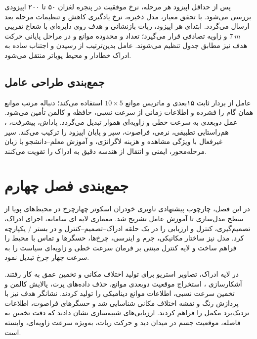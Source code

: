 پس از حداقل اپیزود هر مرحله، نرخ موفقیت در پنجره لغزان ۵۰ تا ۲۰۰ اپیزودی بررسی می‌شود. با تحقق معیار، مدل ذخیره، نرخ یادگیری کاهش و تنظیمات مرحله بعد ارسال می‌گردد. ابتدای هر اپیزود، ربات بازنشانی و هدف روی دایره‌ای با شعاع تقریبی \(7~m\) و زاویه تصادفی قرار می‌گیرد؛ تعداد و محدوده موانع و در مراحل پایانی حرکت هدف نیز مطابق جدول تنظیم می‌شوند. عامل بدین‌ترتیب از رسیدن و اجتناب ساده به ادراک خطادار و محیط پویاتر منتقل می‌شود.

\subsection{جمع‌بندی طراحی عامل}
\label{subsec:agent_design_summary_final}

عامل از بردار ثابت ۱۵بعدی و ماتریس موانع \(10\times5\) استفاده می‌کند؛  دنباله مرتب موانع همان گام را فشرده و اطلاعات زمانی از سرعت نسبی، حافظه و کالمن تأمین می‌شود. عمل دوبعدی به سرعت خطی و زاویه‌ای هموار تبدیل می‌گردد. پاداش، پیشرفت، ، هم‌راستایی تطبیقی، نرمی، فراصوت، سپر و پایان اپیزود را ترکیب می‌کند. سپر غیرفعال با ویژگی مشاهده و هزینه لاگرانژی، و آموزش معلم--دانشجو با زیان مرحله‌محور، ایمنی و انتقال از هندسه دقیق به ادراک را تقویت می‌کنند.

\section{جمع‌بندی فصل چهارم}
\label{sec:chapter4_summary}

در این فصل، چارچوب پیشنهادی ناوبری خودران اسکوتر چهارچرخ در محیط‌های پویا از سطح مدل‌سازی تا آموزش عامل تشریح شد. معماری لایه ای سامانه، اجزای ادراک، تصمیم‌گیری، کنترل و ارزیابی را در یک حلقه ادراک--تصمیم--کنترل و در بستر / یکپارچه کرد. مدل  نیز ساختار مکانیکی، جرم و اینرسی، چرخ‌ها، حسگرها و تماس با محیط را فراهم ساخت و لایه کنترل مبتنی بر  فرمان سرعت خطی و زاویه‌ای سیاست را به سرعت چهار چرخ تبدیل نمود.

در لایه ادراک، تصاویر استریو برای تولید اختلاف مکانی و تخمین عمق به کار رفتند. آشکارسازی ، استخراج موقعیت دوبعدی موانع، حذف داده‌های پرت، پالایش کالمن و تخمین سرعت نسبی، اطلاعات موانع دینامیکی را تولید کردند. نشانگر هدف نیز با پردازش رنگ و نقشه اختلاف مکانی شناسایی شد و حسگرهای فراصوت، اطلاعات نزدیک‌برد مکمل را فراهم کردند. ارزیابی‌های شبیه‌سازی نشان دادند که دقت تخمین به فاصله، موقعیت جسم در میدان دید و حرکت ربات، به‌ویژه سرعت زاویه‌ای، وابسته است.

